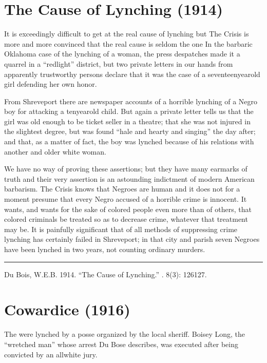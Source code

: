 \documentclass[letterpaper,10pt,english]{jupyterBook}
\begin{document}
\section{The Cause of Lynching (1914)}
\label{\detokenize{Volumes/08/03/cause_of_lynching:the-cause-of-lynching-1914}}\label{\detokenize{Volumes/08/03/cause_of_lynching::doc}}
\sphinxAtStartPar
It is exceedingly difficult to get at the real cause of lynching but The Crisis is more and more convinced that the real cause is seldom the one In the barbaric Oklahoma case of the lynching of a woman, the press despatches made it a quarrel in a “redlight” district, but two private letters in our hands from apparently trustworthy persons declare that it was the case of a seventeen\sphinxhyphen{}year\sphinxhyphen{}old girl defending her own honor.

\sphinxAtStartPar
From Shreveport there are newspaper accounts of a horrible lynching of a Negro boy for attacking a ten\sphinxhyphen{}year\sphinxhyphen{}old child. But again a private letter tells us that the girl was old enough to be ticket seller in a theatre; that she was not injured in the slightest degree, but was found “hale and hearty and singing” the day after; and that, as a matter of fact, the boy was lynched because of his relations with another and older white woman.

\sphinxAtStartPar
We have no way of proving these assertions; but they have many ear\sphinxhyphen{}marks of truth and their very assertion is an astounding indictment of modern American barbarism. The Crisis knows that Negroes are human and it does not for a moment presume that every Negro accused of a horrible crime is innocent. It wants, and wants for the sake of colored people even more than of others, that colored criminals be treated so as to decrease crime, whatever that treatment may be. It is painfully significant that of all methods of suppressing crime lynching has certainly failed in Shreveport; in that city and parish seven Negroes have been lynched in two years, not counting ordinary murders.


\bigskip\hrule\bigskip


\sphinxAtStartPar
{} Du Bois, W.E.B. 1914. “The Cause of Lynching.” . 8(3): 126\sphinxhyphen{}127.


\section{Cowardice (1916)}
\label{\detokenize{Volumes/12/06/cowardice:cowardice-1916}}\label{\detokenize{Volumes/12/06/cowardice::doc}}
\begin{sphinxShadowBox}
\sphinxstylesidebartitle{}

\sphinxAtStartPar
The  were lynched by a posse organized by the local sheriff. Boisey Long, the “wretched man” whose arrest Du Bose describes, was executed after being convicted by an all\sphinxhyphen{}white jury.
\end{sphinxShadowBox}
\end{document}
